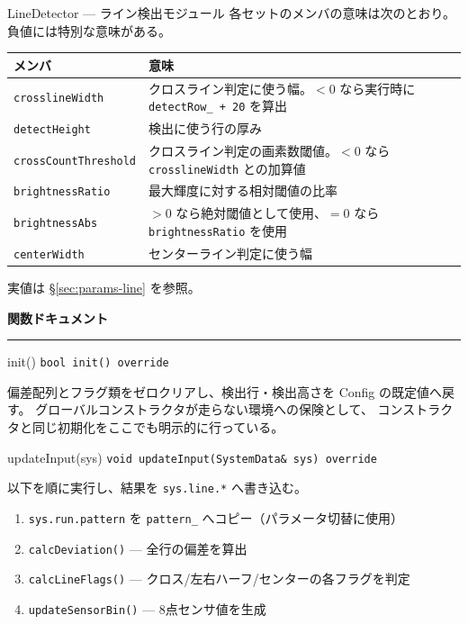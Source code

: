 \documentclass[a4paper,11pt,dvipdfmx]{jsarticle}
\makeatletter
\newcommand{\apisection}[1]{%
  \par\addvspace{4mm}%
  {\normalsize\bfseries\color{headerblue} #1}%
  \par\vspace{-1mm}%
  {\color{accentblue!40}\rule{\linewidth}{0.5pt}}%
  \par\nobreak\vspace{2mm}%
  \@afterheading
}
\makeatother
\begin{document}
\begin{apibox}{LineDetector --- ライン検出モジュール}
\vspace{2mm}
各セットのメンバの意味は次のとおり。負値には特別な意味がある。

\begin{tabularx}{\textwidth}{l X}
\toprule
\textbf{メンバ} & \textbf{意味} \\
\midrule
\texttt{crosslineWidth}      & クロスライン判定に使う幅。$<0$ なら実行時に \texttt{detectRow\_ + 20} を算出 \\
\texttt{detectHeight}        & 検出に使う行の厚み \\
\texttt{crossCountThreshold} & クロスライン判定の画素数閾値。$<0$ なら \texttt{crosslineWidth} との加算値 \\
\texttt{brightnessRatio}     & 最大輝度に対する相対閾値の比率 \\
\texttt{brightnessAbs}       & $>0$ なら絶対閾値として使用、$=0$ なら \texttt{brightnessRatio} を使用 \\
\texttt{centerWidth}         & センターライン判定に使う幅 \\
\bottomrule
\end{tabularx}

\vspace{2mm}
実値は \hyperref[sec:params-line]{§\ref*{sec:params-line}} を参照。

\apisection{関数ドキュメント}

\begin{funcblock}{init()}
\texttt{bool init() override}

\vspace{1.5mm}
偏差配列とフラグ類をゼロクリアし、検出行・検出高さを Config の既定値へ戻す。
グローバルコンストラクタが走らない環境への保険として、
コンストラクタと同じ初期化をここでも明示的に行っている。
\end{funcblock}

\begin{funcblock}{updateInput(sys)}
\texttt{void updateInput(SystemData\& sys) override}

\vspace{1.5mm}
以下を順に実行し、結果を \texttt{sys.line.*} へ書き込む。

\begin{enumerate}[nosep, leftmargin=*]
  \item \texttt{sys.run.pattern} を \texttt{pattern\_} へコピー（パラメータ切替に使用）
  \item \texttt{calcDeviation()} --- 全行の偏差を算出
  \item \texttt{calcLineFlags()} --- クロス/左右ハーフ/センターの各フラグを判定
  \item \texttt{updateSensorBin()} --- 8点センサ値を生成
\end{enumerate}
\end{funcblock}


\end{apibox}
\end{document}
